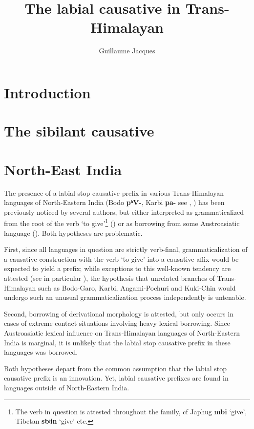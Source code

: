 \documentclass[oneside,a4paper,11pt]{article}
\newcommand{\ipa}[1]{\textbf{{\phon\mbox{#1}}}} %
\begin{document}
\title{The labial causative in Trans-Himalayan}
\author{Guillaume Jacques}
\maketitle
\sloppy

\section{Introduction}


\section{The sibilant causative}
\citet{jacques15causative}

\section{North-East India}
The presence of a labial stop causative prefix in various Trans-Himalayan languages of North-Eastern India (Bodo \ipa{pʰV-}, Karbi \ipa{pa-} see \citealt{delancey15adjectival}, \citealt{konnerth15cisloc}) has been previously noticed by several authors, but either interpreted as  grammaticalized from the root of the verb `to give'\footnote{The verb in question is attested throughout the family, cf Japhug \ipa{mbi} `give', Tibetan \ipa{sbʲin} `give' etc.}
(\citealt[132]{matisoff03}) or as borrowing from some Austroasiatic language (\citealt{konnerth15cisloc, delancey15adjectival}). Both hypotheses are problematic. 

First, since all languages in question are strictly verb-final, grammaticalization of a causative construction with the verb `to give' into a causative affix would be expected to yield a prefix; while exceptions to this well-known tendency are attested (see in particular \citealt{jacques13harmonization}), the hypothesis that unrelated branches of Trans-Himalayan such as Bodo-Garo, Karbi, Angami-Pochuri and Kuki-Chin would undergo such an unusual grammaticalization process independently is untenable. 

Second, borrowing of derivational morphology is attested, but only occurs in cases of extreme contact situations involving heavy lexical borrowing. Since Austroasiatic lexical influence on Trans-Himalayan languages of North-Eastern India is marginal, it is unlikely that the labial stop causative prefix in these languages was borrowed.

Both hypotheses depart from the common assumption that the labial stop causative prefix is an innovation. Yet, labial causative prefixes are found in languages outside of North-Eastern India. 
\end{document}
